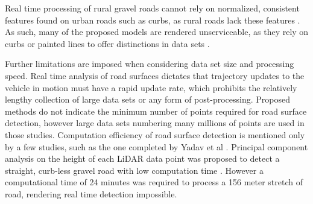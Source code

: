 \documentclass[journal,onecolumn]{IEEEtran}
\begin{document}
	{Real time processing of rural gravel roads cannot rely on normalized, consistent features found on urban roads such as curbs, as rural roads lack these features \cite{skorseth_gravel_nodate}. As such, many of the proposed models are rendered unserviceable, as they rely on curbs or painted lines to offer distinctions in data sets \cite{yadav_extraction_2017,liu_new_2013,qiu_fast_2016,fernandes_road_2014,seker_experiments_nodate,yang_semi-automated_2013,miyazaki_line-based_2014,hervieu_road_2013,smadja_road_nodate}.}
	
	{Further limitations are imposed when considering data set size and processing speed. Real time analysis of road surfaces dictates that trajectory updates to the vehicle in motion must have a rapid update rate, which prohibits the relatively lengthy collection of large data sets or any form of post-processing. Proposed methods \cite{yadav_extraction_2017,yadav_road_2018,yadav_rural_2018,yadav_pole-shaped_2015,miyazaki_line-based_2014,yang_semi-automated_2013,liu_new_2013,qiu_fast_2016} do not indicate the minimum number of points required for road surface detection, however large data sets numbering many millions of points are used in those studies. Computation efficiency of road surface detection is mentioned only by a few studies, such as the one completed by Yadav et al \cite{yadav_road_2018}. Principal component analysis on the height of each LiDAR data point was proposed to detect a straight, curb-less gravel road with low computation time \cite{yadav_road_2018}. However a computational time of 24 minutes was required to process a 156 meter stretch of road, rendering real time detection impossible.}
	
\end{document}
